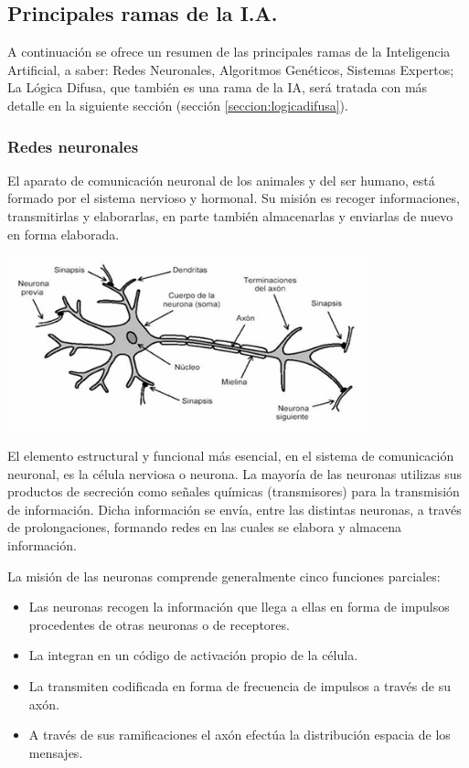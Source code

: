 \subsection{Principales ramas de la I.A.}\label{cap:ramasdelaia}
A continuación se ofrece un resumen de las principales ramas de la Inteligencia Artificial, a saber: Redes Neuronales, Algoritmos Genéticos, Sistemas Expertos; La Lógica Difusa, que también es una rama de la IA, será tratada con más detalle en la siguiente sección (sección \ref{seccion:logicadifusa}).
\subsubsection{Redes neuronales}

El aparato de comunicación neuronal de los animales y del ser humano, está formado por el sistema nervioso y hormonal. Su misión es recoger informaciones, transmitirlas y elaborarlas, en parte también almacenarlas y enviarlas de nuevo en forma elaborada.
\begin{floatingfigure}[r]{10.5cm}
	\includegraphics[width=10.5cm]{Sources/neurona.png}
\end{floatingfigure}

El elemento estructural y funcional más esencial, en el sistema de comunicación neuronal, es la célula nerviosa o neurona. La mayoría de las neuronas utilizas sus productos de secreción como señales químicas (transmisores) para la transmisión de información. Dicha información se envía, entre las distintas neuronas, a través de prolongaciones, formando redes en las cuales se elabora y almacena información.

La misión de las neuronas comprende generalmente cinco funciones parciales:

{\setlength{\baselineskip}{0.7\baselineskip}\begin{itemize}
	\item Las neuronas recogen la información que llega a ellas en forma de impulsos procedentes de otras neuronas o de receptores.
	\item La integran en un código de activación propio de la célula.
	\item La transmiten codificada en forma de frecuencia de impulsos a través de su axón. 
	\item A través de sus ramificaciones el axón efectúa la distribución espacia de los mensajes.
\end{itemize}}

